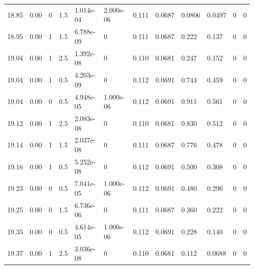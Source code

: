 \documentclass[preview]{standalone}
\begin{document}
{{{{{{{{{{\begin{tabular}{L{1.2cm}C{1.2cm} C{0.3cm}C{0.5cm} C{1.4cm}C{1.4cm} C{1.4cm}C{1.4cm} C{1.6cm}C{1.6cm} C{1.6cm}C{1.6cm}}
  18.85  &  0.00  & 0     & 1.5 &  1.014e-04  & 2.000e-06  &  0.111&   0.0687& 0.0806 & 0.0497   &  0 & 0  \\ 
  18.95  &  0.00  & 1     & 1.5 &  6.788e-09  & 0  &  0.111&   0.0687& 0.222 & 0.137   &  0 & 0  \\ 
  19.04  &  0.00  & 1     & 2.5 &  1.392e-08  & 0  &  0.110&   0.0681& 0.247 & 0.152   &  0 & 0  \\ 
  19.04  &  0.00  & 1     & 0.5 &  4.203e-09  & 0  &  0.112&   0.0691& 0.744 & 0.459   &  0 & 0  \\ 
  19.04  &  0.00  & 0     & 0.5 &  4.948e-05  & 1.000e-06  &  0.112&   0.0691& 0.911 & 0.561   &  0 & 0  \\ 
  19.12  &  0.00  & 1     & 2.5 &  2.083e-08  & 0  &  0.110&   0.0681& 0.830 & 0.512   &  0 & 0  \\ 
  19.14  &  0.00  & 1     & 1.5 &  2.037e-08  & 0  &  0.111&   0.0687& 0.776 & 0.478   &  0 & 0  \\ 
  19.16  &  0.00  & 1     & 0.5 &  5.252e-08  & 0  &  0.112&   0.0691& 0.500 & 0.308   &  0 & 0  \\ 
  19.23  &  0.00  & 0     & 0.5 &  7.041e-05  & 1.000e-06  &  0.112&   0.0691& 0.480 & 0.296   &  0 & 0  \\ 
  19.25  &  0.00  & 0     & 1.5 &  6.736e-06  & 0  &  0.111&   0.0687& 0.360 & 0.222   &  0 & 0  \\ 
  19.35  &  0.00  & 0     & 0.5 &  4.614e-05  & 1.000e-06  &  0.112&   0.0691& 0.228 & 0.140   &  0 & 0  \\ 
  19.37  &  0.00  & 1     & 2.5 &  3.036e-08  & 0  &  0.110&   0.0681& 0.112 & 0.0688   &  0 & 0  \\ 
\hline 
\end{tabular} 

}}}}}}}}}}
\end{document}
